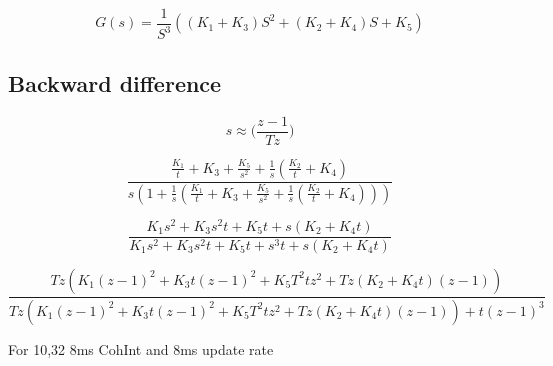 \begin{equation}
G(s) = \frac{1}{S^3}((K_1 + K_3)S^2 + (K_2 + K_4)S + K_5)
\end{equation}




\subsection{Backward difference}

\begin{equation}
s \approx \Big(\frac{z-1}{Tz}\Big)
\end{equation}

\begin{comment}
\begin{equation}
 H(s) = \frac{s^2(K1) + s(K2) + K3}
 {s^3+ s^2(K1)+ s(K2) + K3}
\end{equation}

\begin{equation}
 H(s) = \frac{\Big(\frac{z-1}{Tz}\Big)^2(K1) + \Big(\frac{z-1}{Tz}\Big)(K2) + K3}{\Big(\frac{z-1}{Tz}\Big)^3+ \Big(\frac{z-1}{Tz}\Big)^2(K1)+ \Big(\frac{z-1}{Tz}\Big)(K2) + K3}
\end{equation}
\end{comment}

\begin{equation}
\frac{\frac{K_{1}}{t} + K_{3} + \frac{K_{5}}{s^{2}} + \frac{1}{s} \left(\frac{K_{2}}{t} + K_{4}\right)}{s \left(1 + \frac{1}{s} \left(\frac{K_{1}}{t} + K_{3} + \frac{K_{5}}{s^{2}} + \frac{1}{s} \left(\frac{K_{2}}{t} + K_{4}\right)\right)\right)}
\end{equation}

\begin{equation}
\frac{K_{1} s^{2} + K_{3} s^{2} t + K_{5} t + s \left(K_{2} + K_{4} t\right)}{K_{1} s^{2} + K_{3} s^{2} t + K_{5} t + s^{3} t + s \left(K_{2} + K_{4} t\right)}
\end{equation}

\begin{equation}
\frac{T z \left(K_{1} \left(z - 1\right)^{2} + K_{3} t \left(z - 1\right)^{2} + K_{5} T^{2} t z^{2} + T z \left(K_{2} + K_{4} t\right) \left(z - 1\right)\right)}{T z \left(K_{1} \left(z - 1\right)^{2} + K_{3} t \left(z - 1\right)^{2} + K_{5} T^{2} t z^{2} + T z \left(K_{2} + K_{4} t\right) \left(z - 1\right)\right) + t \left(z - 1\right)^{3}}
\end{equation}

For 10,32 8ms CohInt and 8ms update rate

